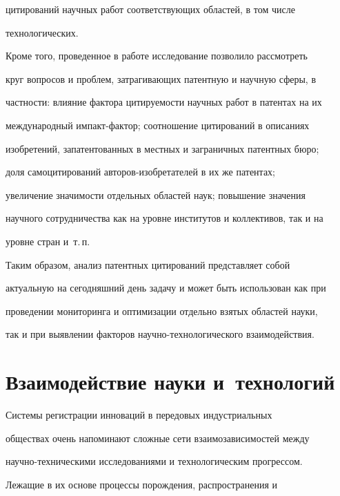 цитирований научных работ соответствующих областей, в том числе 


технологических.


     


     Кроме того, проведенное в работе исследование позволило рассмотреть 


круг вопросов и проблем, затрагивающих патентную и научную сферы, в 


частности: влияние фактора цитируемости научных работ в патентах на их 


международный импакт-фактор; соотношение цитирований в описаниях 


изобретений, запатентованных в местных и заграничных патентных бюро; 


доля самоцитирований ав\-то\-ров-изобре\-та\-те\-лей в их же патентах; 


увеличение значимости отдельных областей наук; повышение значения 


научного сотрудничества как на уровне институтов и коллективов, так и на 


уровне стран и~т.\,п. 


     


     Таким образом, анализ патентных цитирований представляет собой 


актуальную на сегодняшний день задачу и может быть использован как при 


проведении мониторинга и оптимизации отдельно взятых областей науки, 


так и при выявлении факторов научно-технологического взаимодействия.


     


\section{Взаимодействие науки и~технологий}





     Системы регистрации инноваций в передовых индустриальных 


обществах очень напоминают сложные сети взаимозависимостей между 


научно-тех\-ни\-че\-ски\-ми исследованиями и технологическим прогрессом. 


Лежащие в их основе процессы порождения, распространения и 



